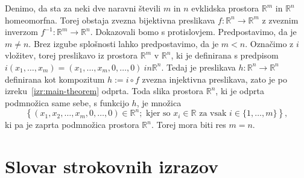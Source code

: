 \documentclass[mat1]{fmfdelo}
\newcommand{\literatura}{literatura}  %
\newcommand{\R}{\mathbb R}
\newcommand{\0}{\underline{0}}
\begin{document}
\begin{dokaz}
Denimo, da sta za neki dve naravni števili $m$ in $n$ evklidska prostora $\R^m$ in $\R^n$ homeomorfna. Torej obstaja zvezna bijektivna preslikava $f : \R^n \to \R^m$ z zveznim inverzom $f^{-1} : \R^m \to \R^n$. Dokazovali bomo s protislovjem. Predpostavimo, da je $m \neq n$. Brez izgube splošnosti lahko predpostavimo, da je $m < n$. Označimo z $i$ vložitev, torej preslikavo iz prostora $\R^m$ v $\R^n$, ki je definirana s predpisom $i(x_1, \dots, x_m) = (x_1, \dots, x_m, 0, \dots, 0) \ in \R^n$. Tedaj je preslikava $h : \R^n \to \R^n$ definirana kot kompozitum $h := i \circ f$ zvezna injektivna preslikava, zato je po izreku~\ref{izr:main-theorem} odprta. Toda slika prostora $\R^n$, ki je odprta podmnožica same sebe, s funkcijo $h$, je množica 
$$\left \{ (x_1, x_2, \dots, x_m, 0, \dots, 0) \in \R^n ; \text{ kjer so } x_i \in \R \text{ za vsak } i \in \{1, \dots, m \}  \right \},$$
 ki pa je zaprta podmnožica prostora $\R^n$. Torej mora biti res $m = n$.
\end{dokaz}
\section*{Slovar strokovnih izrazov}



        
\end{document}
